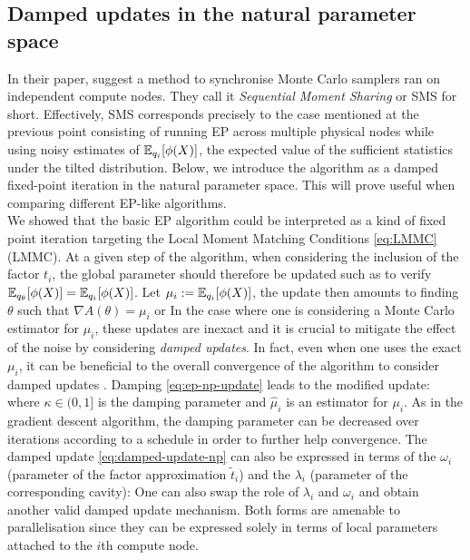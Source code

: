 \subsection{Damped updates in the natural parameter space}
In their paper, \citet{xu14} suggest a method to synchronise Monte Carlo samplers ran on independent compute nodes. They call it \emph{Sequential Moment Sharing} or SMS for short. Effectively, SMS corresponds precisely to the case mentioned at the previous point consisting of running EP across multiple physical nodes while using noisy estimates of $\mathbb E_{q_i}[\phi(X)]$, the expected value of the sufficient statistics under the tilted distribution. 
Below, we introduce the algorithm as a damped fixed-point iteration in the natural parameter space. This will prove useful when comparing different EP-like algorithms.\\

We showed that the basic EP algorithm could be interpreted as a kind of fixed point iteration targeting the Local Moment Matching Conditions \eqref{eq:LMMC} (LMMC). At a given step of the algorithm, when considering the inclusion of the factor $t_i$, the global parameter should therefore be updated such as to verify $\mathbb E_{q_\theta}[\phi(X)]= \mathbb E_{q_i}[\phi(X)]$. Let $\mu_i:=\mathbb E_{q_i}[\phi(X)]$, the update then amounts to finding $\theta$ such that $\nabla A(\theta) = \mu_i$ or
%
%
In the case where one is considering a Monte Carlo estimator for $\mu_i$, these updates are inexact and it is crucial to mitigate the effect of the noise by considering \emph{damped updates}. In fact, even when one uses the exact $\mu_i$, it can be beneficial to the overall convergence of the algorithm to consider damped updates \citep{heskes03}. Damping \eqref{eq:ep-np-update} leads to the modified update:
%
%
where $\kappa \in(0,1]$ is the damping parameter and $\hat\mu_i$ is an estimator for $\mu_i$. As in the gradient descent algorithm, the damping parameter can be decreased over iterations according to a schedule in order to further help convergence.
The damped update \eqref{eq:damped-update-np} can also be expressed in terms of the $\omega_i$ (parameter of the factor approximation $\tilde t_i$) and the $\lambda_i$ (parameter of the corresponding cavity):
%
%
One can also swap the role of $\lambda_i$ and $\omega_i$ and obtain another valid damped update mechanism. Both forms are amenable to parallelisation since they can be expressed solely in terms of local parameters attached to the $i$th compute node.\\

